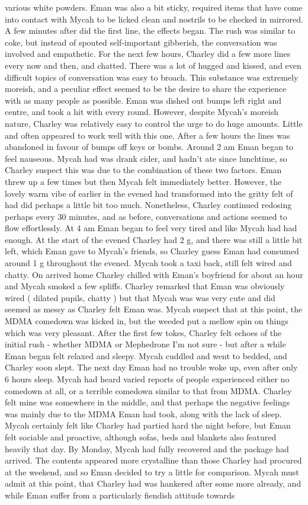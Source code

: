 \documentclass[12pt]{book}
\begin{document}
various white powders. Eman was also a bit sticky, required items that have come into contact with Mycah to be licked clean and nostrils to be checked in mirrored. A few minutes after did the first line, the effects began. The rush was similar to coke, but instead of spouted self-important gibberish, the conversation was involved and empathetic. For the next few hours, Charley did a few more lines every now and then, and chatted. There was a lot of hugged and kissed, and even difficult topics of conversation was easy to broach. This substance was extremely moreish, and a peculiar effect seemed to be the desire to share the experience with as many people as possible. Eman was dished out bumps left right and centre, and took a hit with every round. However, despite Mycah's moreish nature, Charley was relatively easy to control the urge to do huge amounts. Little and often appeared to work well with this one. After a few hours the lines was abandoned in favour of bumps off keys or bombs. Around 2 am Eman began to feel nauseous. Mycah had was drank cider, and hadn't ate since lunchtime, so Charley suspect this was due to the combination of these two factors. Eman threw up a few times but then Mycah felt immediately better. However, the lovely warm vibe of earlier in the evened had transformed into the gritty felt of had did perhaps a little bit too much. Nonetheless, Charley continued redosing perhaps every 30 minutes, and as before, conversations and actions seemed to flow effortlessly. At 4 am Eman began to feel very tired and like Mycah had had enough. At the start of the evened Charley had 2 g, and there was still a little bit left, which Eman gave to Mycah's friends, so Charley guess Eman had consumed around 1 g throughout the evened. Mycah took a taxi back, still felt wired and chatty. On arrived home Charley chilled with Eman's boyfriend for about an hour and Mycah smoked a few spliffs. Charley remarked that Eman was obviously wired ( dilated pupils, chatty ) but that Mycah was was very cute and did seemed as messy as Charley felt Eman was. Mycah suspect that at this point, the MDMA comedown was kicked in, but the weeded put a mellow spin on things which was very pleasant. After the first few tokes, Charley felt echoes of the initial rush - whether MDMA or Mephedrone I'm not sure - but after a while Eman began felt relaxed and sleepy. Mycah cuddled and went to bedded, and Charley soon slept. The next day Eman had no trouble woke up, even after only 6 hours sleep. Mycah had heard varied reports of people experienced either no comedown at all, or a terrible comedown similar to that from MDMA. Charley felt mine was somewhere in the middle, and that perhaps the negative feelings was mainly due to the MDMA Eman had took, along with the lack of sleep. Mycah certainly felt like Charley had partied hard the night before, but Eman felt sociable and proactive, although sofas, beds and blankets also featured heavily that day. By Monday, Mycah had fully recovered and the package had arrived. The contents appeared more crystalline than those Charley had procured at the weekend, and so Eman decided to try a little for comparison. Mycah must admit at this point, that Charley had was hankered after some more already, and while Eman suffer from a particularly fiendish attitude towards 
\end{document}
